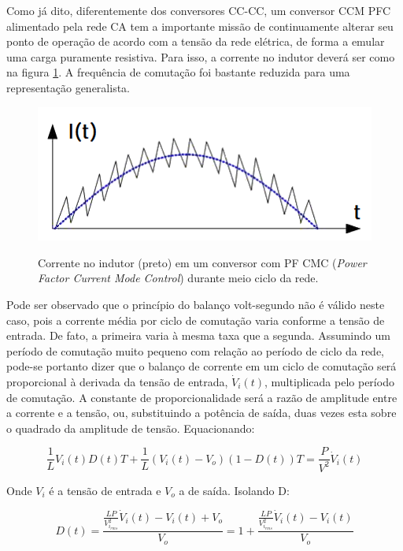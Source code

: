 \documentclass[
        12pt,
        openany, %
        oneside, %
        a4paper,			
        english,			
        brazil
        ]{abntbibufjf}
\begin{document}
Como já dito, diferentemente dos conversores CC-CC, um conversor CCM PFC alimentado pela rede CA tem a importante missão de continuamente alterar seu ponto de operação de acordo com a tensão da rede elétrica, de forma a emular uma carga puramente resistiva. Para isso, a corrente no indutor deverá ser como na figura \ref{cmc_wav}. A frequência de comutação foi bastante reduzida para uma representação generalista.

\begin{figure}[!h]
	\centering
	\caption{Corrente no indutor (preto) em um conversor com PF CMC (\textit{Power Factor Current Mode Control}) durante meio ciclo da rede.}
	\includegraphics[scale=1]{../RABISCOS/cmc_wav.png}\\
	\label{cmc_wav}
\end{figure}

Pode ser observado que o princípio do balanço volt-segundo não é válido neste caso, pois a corrente média por ciclo de comutação varia conforme a tensão de entrada. De fato, a primeira varia à mesma taxa que a segunda. Assumindo um período de comutação muito pequeno com relação ao período de ciclo da rede, pode-se portanto dizer que o balanço de corrente em um ciclo de comutação será proporcional à derivada da tensão de entrada, $\dot{V}_i(t)$, multiplicada pelo período de comutação. A constante de proporcionalidade será a razão de amplitude entre a corrente e a tensão, ou, substituindo a potência de saída, duas vezes esta sobre o quadrado da amplitude de tensão. Equacionando:

\begin{equation}
\frac{1}{L}V_i(t)D(t)T+\frac{1}{L}(V_i(t)-V_o)(1-D(t))T = \frac{P}{V^2}\dot{V}_i(t)
\label{balance_cmc}
\end{equation}

Onde $V_i$ é a tensão de entrada e $V_o$ a de saída. Isolando D:

\begin{equation}
D(t)=\frac{ \frac{LP}{V_{i_{rms}}^2} \dot{V}_i(t)-V_i(t)+V_o}{V_o}=1+\frac{ \frac{LP}{V_{i_{rms}}^2} \dot{V}_i(t)-V_i(t)}{V_o}
\end{equation}
\end{document}
